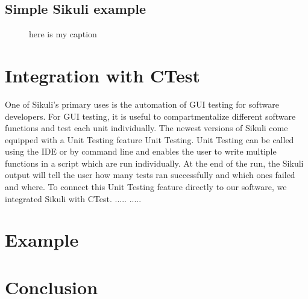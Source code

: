 \documentclass{InsightArticle}
\begin{document}
 


\subsection{Simple Sikuli example} %

\begin{figure}[htp]
 \centering
 
 \caption{here is my caption}
 \label{fig:SimpleExample}
\end{figure}

\section{Integration with CTest}
One of Sikuli's primary uses is the automation of GUI testing for software
developers.  For GUI testing, it is useful to compartmentalize different software functions and test each unit
individually.  The newest versions of Sikuli come equipped with a Unit Testing feature 
Unit Testing.  Unit Testing can be called using the IDE or by command
line and enables the user to write multiple functions in a script which are
run individually.  At the end of the run, the Sikuli output will tell the user
how many tests ran successfully and which ones failed and where.  To connect this
Unit Testing feature directly to our software, we integrated Sikuli with CTest.
.....
.....


\section{Example}

\section{Conclusion}

\clearpage



\end{document}
